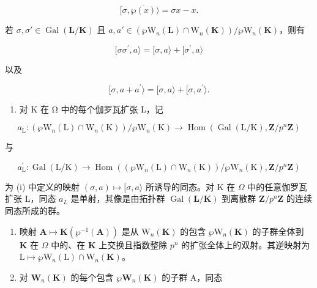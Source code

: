 \[
[ \sigma , \overline {{\wp (x)}} \rangle = \sigma x - x.
\]

若 \(\sigma, \sigma' \in \operatorname{Gal}(\mathbf{L} / \mathbf{K})\) 且 \(a, a' \in (\wp \mathrm{W}_n(\mathbf{L}) \cap \mathrm{W}_n(\mathbf{K})) / \wp \mathrm{W}_n(\mathbf{K})\)，则有

\[
[ \sigma \sigma^ {\prime}, a \rangle = [ \sigma , a \rangle + [ \sigma^ {\prime}, a \rangle
\]

以及

\[
[ \sigma , a + a ^ {\prime} \rangle = [ \sigma , a \rangle + [ \sigma , a ^ {\prime} \rangle .
\]

\begin{enumerate}
\def\labelenumi{(\roman{enumi})}
\setcounter{enumi}{1}
\tightlist
\item
  对 K 在 Ω 中的每个伽罗瓦扩张 L，记
\end{enumerate}

\[
a _ {\mathrm{L}}: (\wp \mathrm{W} _ {n} (\mathrm{L}) \cap \mathrm{W} _ {n} (\mathrm{K})) / \wp \mathrm{W} _ {n} (\mathrm{K}) \rightarrow \operatorname{Hom} (\operatorname{Gal} (\mathrm{L} / \mathrm{K}), \mathbf {Z} / p ^ {n} \mathbf {Z})
\]

与

\[
a _ {\mathrm{L}} ^ {\prime}: \operatorname{Gal} (\mathrm{L} / \mathrm{K}) \rightarrow \operatorname{Hom} ((\wp \mathrm{W} _ {n} (\mathrm{L}) \cap \mathrm{W} _ {n} (\mathrm{K})) / \wp \mathrm{W} _ {n} (\mathrm{K}), \mathbf {Z} / p ^ {n} \mathbf {Z})
\]

为 (i) 中定义的映射 \((\sigma, a) \mapsto [\sigma, a \rangle\) 所诱导的同态。对 K 在 \(\Omega\) 中的任意伽罗瓦扩张 L，同态 \(a_{L}\) 是单射，其像是由拓扑群 \(\operatorname{Gal}(\mathbf{L}/\mathbf{K})\) 到离散群 \(\mathbf{Z}/p^{n}\mathbf{Z}\) 的连续同态所成的群。

\begin{enumerate}
\def\labelenumi{(\roman{enumi})}
\setcounter{enumi}{2}
\item
  映射 \(\mathbf{A} \mapsto \mathbf{K}(\wp^{-1}(\mathbf{A}))\) 是从 \(\mathrm{W}_n(\mathbf{K})\) 的包含 \(\wp\mathrm{W}_n(\mathbf{K})\) 的子群全体到 \(\mathbf{K}\) 在 \(\Omega\) 中的、在 \(\mathbf{K}\) 上交换且指数整除 \(p^n\) 的扩张全体上的双射。其逆映射为 \(\mathrm{L} \mapsto \wp\mathrm{W}_n(\mathrm{L}) \cap \mathrm{W}_n(\mathbf{K})\)。
\item
  对 \(\mathbf{W}_{n}(\mathbf{K})\) 的每个包含 \(\wp\mathbf{W}_{n}(\mathbf{K})\) 的子群 A，同态
\end{enumerate}

